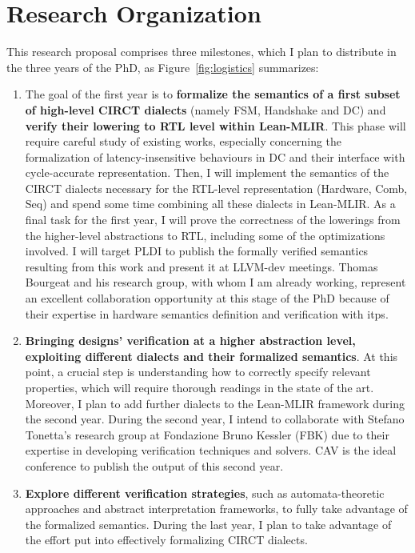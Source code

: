 \documentclass[sigconf,authorversion,nonacm, 11pt]{acmart}
\begin{document}
\section{Research Organization}

This research proposal comprises three milestones, which I plan to distribute in the three years of the PhD, as Figure~\ref{fig:logistics} summarizes: 
\begin{enumerate}
    \item The goal of the first year is to \textbf{formalize the semantics of a first subset of high-level CIRCT dialects} (namely FSM, Handshake and DC) and \textbf{verify their lowering to RTL level within Lean-MLIR}.
    This phase will require careful study of existing works, especially concerning the formalization of latency-insensitive behaviours in DC and their interface with cycle-accurate representation. 
    Then, I will implement the semantics of the CIRCT dialects necessary for the RTL-level representation (Hardware, Comb, Seq) and spend some time combining all these dialects in Lean-MLIR. 
    As a final task for the first year, I will prove the correctness of the lowerings from the higher-level abstractions to RTL, including some of the optimizations involved.
    I will target PLDI to publish the formally verified semantics resulting from this work and present it at LLVM-dev meetings.
    Thomas Bourgeat and his research group, with whom I am already working, represent an excellent collaboration opportunity at this stage of the PhD because of their expertise in hardware semantics definition and verification with \acp{itp}. 
    \item \textbf{Bringing designs' verification at a higher abstraction level, exploiting different dialects and their formalized semantics}. 
    At this point, a crucial step is understanding how to correctly specify relevant properties, which will require thorough readings in the state of the art. 
    Moreover, I plan to add further dialects to the Lean-MLIR framework during the second year. 
    During the second year, I intend to collaborate with Stefano Tonetta's research group at Fondazione Bruno Kessler (FBK) due to their expertise in developing verification techniques and solvers. 
    CAV is the ideal conference to publish the output of this second year.
    \item \textbf{Explore different verification strategies}, such as automata-theoretic approaches and abstract interpretation frameworks, to fully take advantage of the formalized semantics. 
    During the last year, I plan to take advantage of the effort put into effectively formalizing CIRCT dialects. 

\end{enumerate}
\end{document}
